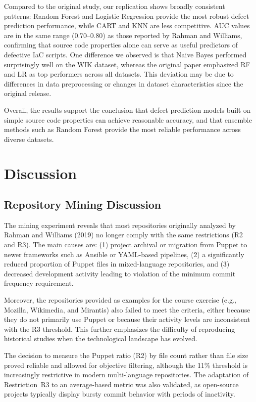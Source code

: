\documentclass[conference]{IEEEtran}
\begin{document}
Compared to the original study, our replication shows broadly consistent patterns: 
Random Forest and Logistic Regression provide the most robust defect prediction performance, while CART and KNN are less competitive. 
AUC values are in the same range (0.70–0.80) as those reported by Rahman and Williams, confirming that source code properties alone can serve as useful predictors of defective IaC scripts. 
One difference we observed is that Naive Bayes performed surprisingly well on the WIK dataset, whereas the original paper emphasized RF and LR as top performers across all datasets. 
This deviation may be due to differences in data preprocessing or changes in dataset characteristics since the original release.

Overall, the results support the conclusion that defect prediction models built on simple source code properties can achieve reasonable accuracy, and that ensemble methods such as Random Forest provide the most reliable performance across diverse datasets.


\section{Discussion}
\subsection{Repository Mining Discussion}
The mining experiment reveals that most repositories originally analyzed by Rahman and Williams (2019) no longer comply with the same restrictions (R2 and R3). The main causes are: (1) project archival or migration from Puppet to newer frameworks such as Ansible or YAML-based pipelines, (2) a significantly reduced proportion of Puppet files in mixed-language repositories, and (3) decreased development activity leading to violation of the minimum commit frequency requirement. 

Moreover, the repositories provided as examples for the course exercise (e.g., Mozilla, Wikimedia, and Mirantis) also failed to meet the criteria, either because they do not primarily use Puppet or because their activity levels are inconsistent with the R3 threshold. This further emphasizes the difficulty of reproducing historical studies when the technological landscape has evolved.

The decision to measure the Puppet ratio (R2) by file count rather than file size proved reliable and allowed for objective filtering, although the 11\% threshold is increasingly restrictive in modern multi-language repositories. The adaptation of Restriction~R3 to an average-based metric was also validated, as open-source projects typically display bursty commit behavior with periods of inactivity.
\end{document}

